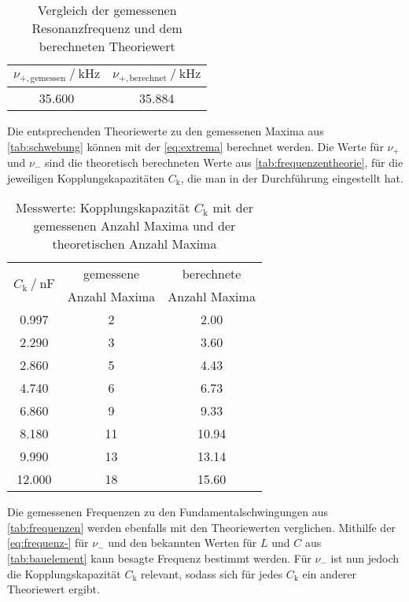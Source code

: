 \begin{table}
  \centering
  \caption{Vergleich der gemessenen Resonanzfrequenz und dem berechneten Theoriewert}
  \label{tab:resonanz}
  \begin{tabular}{c c}
    \toprule 
    $\nu _{+,\text{gemessen}} \:/\: \si{\kilo\hertz}$ & $\nu _{+,\text{berechnet}} \:/\: \si{\kilo\hertz}$    \\ 
    \midrule 
    35.600 & 35.884 \\
    \bottomrule
  \end{tabular}
\end{table}

Die entsprechenden Theoriewerte zu den gemessenen Maxima aus \autoref{tab:schwebung} können mit der \autoref{eq:extrema} berechnet werden. Die Werte für $\nu _+$ und $\nu _-$ sind die theoretisch berechneten Werte aus \autoref{tab:frequenzentheorie}, für die jeweiligen Kopplungskapazitäten $C_\text{k}$, die man in der Durchführung eingestellt hat. 

\begin{table}
  \centering
  \caption{Messwerte: Kopplungskapazität $C_\text{k}$ mit der gemessenen Anzahl Maxima und der theoretischen Anzahl Maxima }
  \label{tab:schwebungstheorie}
  \begin{tabular}{c c c}
    \toprule 
    \multirow{2}{*}{$C_\text{k} \:/\: \si{\nano\farad}$} & gemessene & berechnete \\
    & Anzahl Maxima & Anzahl Maxima \\ 
    \midrule 
    0.997 & 2 & 2.00 \\
    2.290 & 3 & 3.60 \\
    2.860 & 5 & 4.43 \\
    4.740 & 6 & 6.73 \\
    6.860 & 9 & 9.33 \\
    8.180 & 11 & 10.94 \\
    9.990 & 13 & 13.14 \\
    12.000 & 18 & 15.60 \\
    \bottomrule
  \end{tabular}
\end{table}

Die gemessenen Frequenzen zu den Fundamentalschwingungen aus \autoref{tab:frequenzen} werden ebenfalls mit den Theoriewerten verglichen. Mithilfe der \autoref{eq:frequenz-} für $\nu _-$ und den bekannten Werten für $L$ und $C$ aus \autoref{tab:bauelement} kann besagte Frequenz bestimmt werden. Für $\nu_-$ ist nun jedoch die Kopplungskapazität $C_\text{k}$ relevant, sodass sich für jedes $C_\text{k}$ ein anderer Theoriewert ergibt.

